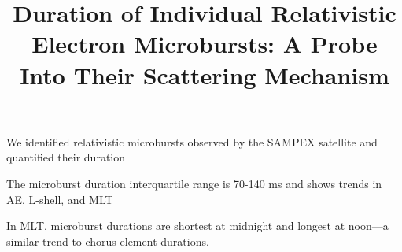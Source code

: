\documentclass[draft]{agujournal2019}
\begin{document}
%
%



\title{Duration of Individual Relativistic Electron Microbursts: A Probe Into Their Scattering Mechanism}






\begin{keypoints}
\item We identified relativistic microbursts observed by the SAMPEX satellite and quantified their duration
\item The microburst duration interquartile range is 70-140 ms and shows trends in AE, L-shell, and MLT
\item In MLT, microburst durations are shortest at midnight and longest at noon---a similar trend to chorus element durations.
\end{keypoints}

%
%

%
%
\end{document}
